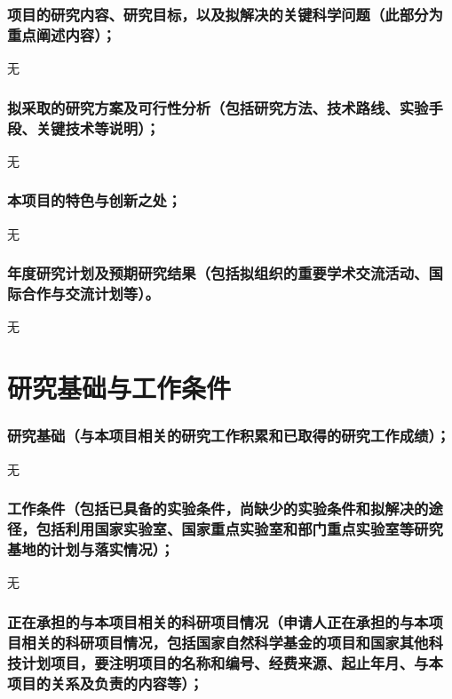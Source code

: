\documentclass{article}
\begin{document}
\section[项目的研究内容、研究目标，以及拟解决的关键科学问题]
{\textbf{项目的研究内容、研究目标，以及拟解决的关键科学问题}（此部分为重点阐述内容）；}

无

\section[拟采取的研究方案及可行性分析]
{\textbf{拟采取的研究方案及可行性分析}（包括研究方法、技术路线、实验手段、关键技术等说明）；}

无

\section{\textbf{本项目的特色与创新之处；}}

无

\section[年度研究计划及预期研究结果]
{\textbf{年度研究计划及预期研究结果}（包括拟组织的重要学术交流活动、国际合作与交流计划等）。}

无

\part{\textbf{研究基础与工作条件}}

\section[研究基础]
{\textbf{研究基础}（与本项目相关的研究工作积累和已取得的研究工作成绩）；}

无

\section[工作条件]
{\textbf{工作条件}（包括已具备的实验条件，尚缺少的实验条件和拟解决的途径，包括利用国家实验室、国家重点实验室和部门重点实验室等研究基地的计划与落实情况）；}

无

\section[正在承担的与本项目相关的科研项目情况]
{\textbf{正在承担的与本项目相关的科研项目情况}（申请人正在承担的与本项目相关的科研项目情况，包括国家自然科学基金的项目和国家其他科技计划项目，要注明项目的名称和编号、经费来源、起止年月、与本项目的关系及负责的内容等）；}
\end{document}
